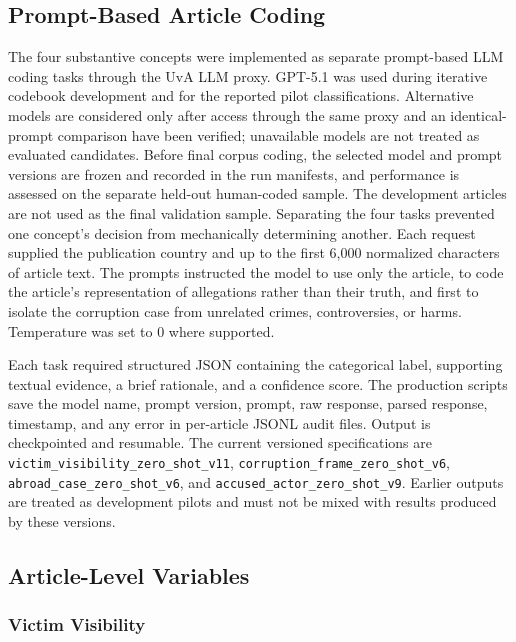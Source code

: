 \subsection{Prompt-Based Article Coding}
\label{sec:method-llm-coding}

The four substantive concepts were implemented as separate prompt-based LLM
coding tasks through the UvA LLM proxy. GPT-5.1 was used during iterative
codebook development and for the reported pilot classifications. Alternative
models are considered only after access through the same proxy and an
identical-prompt comparison have been verified; unavailable models are not
treated as evaluated candidates. Before final corpus coding, the selected
model and prompt versions are frozen and recorded in the run manifests, and
performance is assessed on the separate held-out human-coded sample. The
development articles are not used as the final validation sample. Separating
the four tasks prevented one concept's
decision from mechanically determining another. Each request supplied the
publication country and up to the first 6,000 normalized characters of article
text. The prompts instructed the model to use only the article, to code the
article's representation of allegations rather than their truth, and first to
isolate the corruption case from unrelated crimes, controversies, or harms.
Temperature was set to 0 where supported.

Each task required structured JSON containing the categorical label, supporting
textual evidence, a brief rationale, and a confidence score. The production
scripts save the model name, prompt version, prompt, raw response, parsed
response, timestamp, and any error in per-article JSONL audit files. Output is
checkpointed and resumable. The current versioned specifications are
\nolinkurl{victim_visibility_zero_shot_v11},
\nolinkurl{corruption_frame_zero_shot_v6},
\nolinkurl{abroad_case_zero_shot_v6}, and
\nolinkurl{accused_actor_zero_shot_v9}. Earlier outputs are treated as
development pilots and must not be mixed with results produced by these
versions.

\subsection{Article-Level Variables}
\label{sec:method-variables}

\subsubsection{Victim Visibility}

